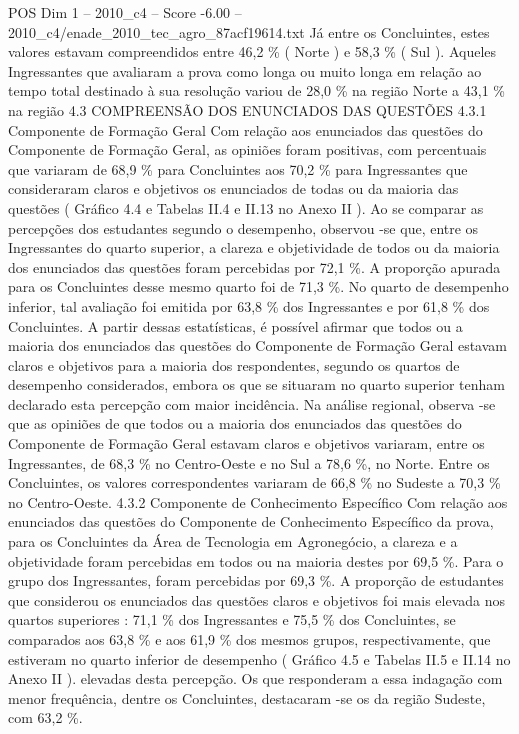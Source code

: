 \begin{textsample}{POS Dim 1 – 2010\_c4 – Score -6.00 – 2010\_c4/enade\_2010\_tec\_agro\_87acf19614.txt}
Já entre os Concluintes, estes valores estavam compreendidos entre 46,2 \% ( Norte ) e 58,3 \% ( Sul ).
Aqueles Ingressantes que avaliaram a prova como longa ou muito longa em relação ao tempo total destinado à sua resolução variou de 28,0 \% na região Norte a 43,1 \% na região 4.3 COMPREENSÃO DOS ENUNCIADOS DAS QUESTÕES 4.3.1 Componente de Formação Geral Com relação aos enunciados das questões do Componente de Formação Geral, as opiniões foram positivas, com percentuais que variaram de 68,9 \% para Concluintes aos 70,2 \% para Ingressantes que consideraram claros e objetivos os enunciados de todas ou da maioria das questões ( Gráfico 4.4 e Tabelas II.4 e II.13 no Anexo II ).
Ao se comparar as percepções dos estudantes segundo o desempenho, observou -se que, entre os Ingressantes do quarto superior, a clareza e objetividade de todos ou da maioria dos enunciados das questões foram percebidas por 72,1 \%.
A proporção apurada para os Concluintes desse mesmo quarto foi de 71,3 \%.
No quarto de desempenho inferior, tal avaliação foi emitida por 63,8 \% dos Ingressantes e por 61,8 \% dos Concluintes.
A partir dessas estatísticas, é possível afirmar que todos ou a maioria dos enunciados das questões do Componente de Formação Geral estavam claros e objetivos para a maioria dos respondentes, segundo os quartos de desempenho considerados, embora os que se situaram no quarto superior tenham declarado esta percepção com maior incidência.
Na análise regional, observa -se que as opiniões de que todos ou a maioria dos enunciados das questões do Componente de Formação Geral estavam claros e objetivos variaram, entre os Ingressantes, de 68,3 \% no Centro-Oeste e no Sul a 78,6 \%, no Norte.
Entre os Concluintes, os valores correspondentes variaram de 66,8 \% no Sudeste a 70,3 \% no Centro-Oeste. 4.3.2 Componente de Conhecimento Específico Com relação aos enunciados das questões do Componente de Conhecimento Específico da prova, para os Concluintes da Área de Tecnologia em Agronegócio, a clareza e a objetividade foram percebidas em todos ou na maioria destes por 69,5 \%.
Para o grupo dos Ingressantes, foram percebidas por 69,3 \%.
A proporção de estudantes que considerou os enunciados das questões claros e objetivos foi mais elevada nos quartos superiores : 71,1 \% dos Ingressantes e 75,5 \% dos Concluintes, se comparados aos 63,8 \% e aos 61,9 \% dos mesmos grupos, respectivamente, que estiveram no quarto inferior de desempenho ( Gráfico 4.5 e Tabelas II.5 e II.14 no Anexo II ). elevadas desta percepção.
Os que responderam a essa indagação com menor frequência, dentre os Concluintes, destacaram -se os da região Sudeste, com 63,2 \%.

\end{textsample}
